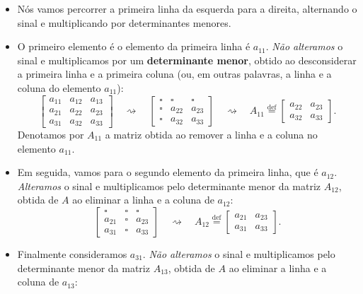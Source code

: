 \begin{itemize}
\item Nós vamos percorrer a primeira linha da esquerda para a direita, alternando o sinal e multiplicando por determinantes menores.
\item O primeiro elemento é o elemento da primeira linha é $a_{11}$. \textit{Não alteramos} o sinal e multiplicamos por um \textbf{determinante menor}, obtido ao desconsiderar a primeira linha e a primeira coluna (ou, em outras palavras, a linha e a coluna do elemento $a_{11}$):
\begin{equation}
\begin{bmatrix}
a_{11} & a_{12} & a_{13} \\
a_{21} & a_{22} & a_{23} \\
a_{31} & a_{32} & a_{33}
\end{bmatrix} \quad \rightsquigarrow \quad
\begin{bmatrix}
\square & \square & \square \\
\square & a_{22}  & a_{23} \\
\square & a_{32}  & a_{33}
\end{bmatrix} \quad \rightsquigarrow \quad A_{11} \stackrel{\text{def}}{=}
\begin{bmatrix}
a_{22}  & a_{23} \\
a_{32}  & a_{33}
\end{bmatrix}.
\end{equation} Denotamos por $A_{11}$ a matriz obtida ao remover a linha e a coluna no elemento $a_{11}$.
\item Em seguida, vamos para o segundo elemento da primeira linha, que é $a_{12}$. \textit{Alteramos} o sinal e multiplicamos pelo determinante menor da matriz $A_{12}$, obtida de $A$ ao eliminar a linha e a coluna de $a_{12}$:
\begin{equation}
\begin{bmatrix}
\square & \square & \square \\
a_{21}  & \square & a_{23} \\
a_{31}  & \square & a_{33}
\end{bmatrix} \quad \rightsquigarrow \quad A_{12} \stackrel{\text{def}}{=}
\begin{bmatrix}
a_{21}  & a_{23} \\
a_{31}  & a_{33}
\end{bmatrix}.
\end{equation}
\item Finalmente consideramos $a_{31}$. \textit{Não alteramos} o sinal e multiplicamos pelo determinante menor da matriz $A_{13}$, obtida de $A$ ao eliminar a linha e a coluna de $a_{13}$:

\end{itemize}
